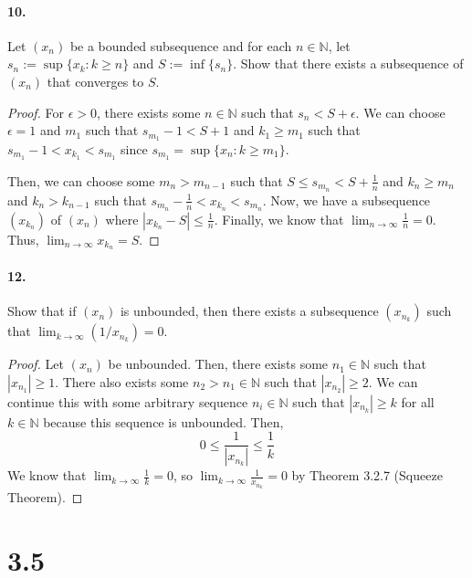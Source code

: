 \documentclass[12pt]{article}
\newcommand\N{\mathbb{N}}
\theoremstyle{remark}
\begin{document}
\paragraph{10.} Let $(x_n)$ be a bounded subsequence and for each $n \in \N$, let $s_n := \sup\{x_k : k \geq n\}$ and $S := \inf\{s_n\}$. Show that there exists a subsequence of $(x_n)$ that converges to $S$.
\begin{proof}
    For $\epsilon > 0$, there exists some $n \in \N$ such that $s_n < S + \epsilon$. We can choose $\epsilon = 1$ and $m_1$ such that $s_{m_1} - 1 < S + 1$ and $k_1 \geq m_1$ such that $s_{m_1} - 1 < x_{k_1} < s_{m_1}$ since $s_{m_1} = \sup\{x_n : k \geq m_1\}$.

    Then, we can choose some $m_n > m_{n - 1}$ such that $S \leq s_{m_n} < S + \frac{1}{n}$ and $k_n \geq m_n$ and $k_n > k_{n - 1}$ such that $s_{m_n} - \frac{1}{n} < x_{k_n} < s_{m_n}$. Now, we have a subsequence $(x_{k_n})$ of $(x_n)$ where $|x_{k_n} - S| \leq \frac{1}{n}$. Finally, we know that $\lim_{n \to \infty} \frac{1}{n} = 0$. Thus, $\lim_{n \to \infty} x_{k_n} = S$.
\end{proof}

\paragraph{12.} Show that if $(x_n)$ is unbounded, then there exists a subsequence $(x_{n_k})$ such that $\lim_{k \to \infty} (1/x_{n_k}) = 0$.
\begin{proof}
    Let $(x_n)$ be unbounded. Then, there exists some $n_1 \in \N$ such that $|x_{n_1}| \geq 1$. There also exists some $n_2 > n_1 \in \N$ such that $|x_{n_2}| \geq 2$. We can continue this with some arbitrary sequence $n_i \in \N$ such that $|x_{n_k}| \geq k$ for all $k \in \N$ because this sequence is unbounded. Then, $$0 \leq \frac{1}{|x_{n_k}|} \leq \frac{1}{k}$$ We know that $\lim_{k \to \infty} \frac{1}{k} = 0$, so $\lim_{k \to \infty} \frac{1}{x_{n_k}} = 0$ by Theorem 3.2.7 (Squeeze Theorem).
\end{proof}

\section*{3.5}
\end{document}
